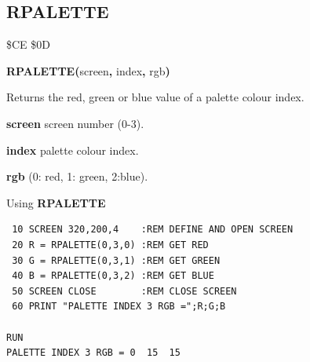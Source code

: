 \subsection{RPALETTE}
\begin{description}[leftmargin=2cm,style=nextline]
\item [Token:] \$CE \$0D
\item [Format:] {\bf RPALETTE(}screen{\bf,} index{\bf,} rgb{\bf)}
\item [Usage:]  Returns the red, green or blue value of
                a palette colour index.

                {\bf screen} screen number (0-3).

                {\bf index} palette colour index.

                {\bf rgb} (0: red, 1: green, 2:blue).

\item [Example:] Using {\bf RPALETTE}

\begin{tcolorbox}[colback=black,coltext=white]
\verbatimfont{\codefont}
\begin{verbatim}
 10 SCREEN 320,200,4    :REM DEFINE AND OPEN SCREEN
 20 R = RPALETTE(0,3,0) :REM GET RED
 30 G = RPALETTE(0,3,1) :REM GET GREEN
 40 B = RPALETTE(0,3,2) :REM GET BLUE
 50 SCREEN CLOSE        :REM CLOSE SCREEN
 60 PRINT "PALETTE INDEX 3 RGB =";R;G;B

RUN
PALETTE INDEX 3 RGB = 0  15  15
\end{verbatim}
\end{tcolorbox}
\end{description}


\newpage
